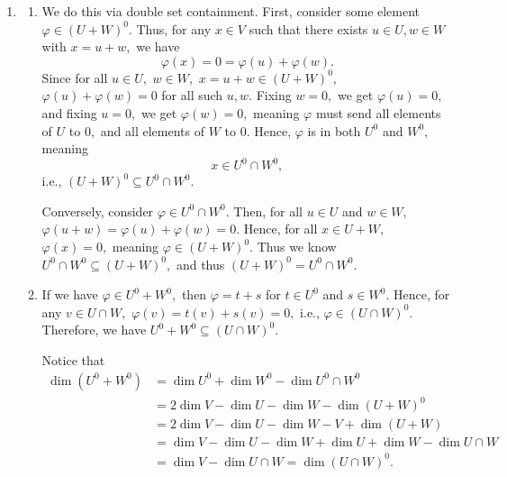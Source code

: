 \documentclass[12pt]{article}
\begin{document}
\begin{enumerate}
\begin{enumerate}
      \item Assume that $T: V \to W$ is surjective. Then, assume we
        have $\varphi, \psi \in W'$ such that $T(\varphi) = T(\psi),$
        or equivalently,
        $$
        \varphi \circ T = \psi \circ T.
        $$
        Hence, $$
        \varphi(T(v)) = \psi(T(v))
        $$
        for all $v \in V.$ Since $T$ is surjective, $\text{range}\, T
        = W,$ meaning for all $w \in W$ there is some $v_0$ such that
        $T(v_0) = w.$ Hence, for all $w,$ $\varphi(w) = \psi(w),$
        meaning $\varphi = \psi$ as required, since functionals are
        unique. Thus, $T'$ is injective, since $$T' \varphi = T '
        \psi \Rightarrow \varphi = \psi.$$
    \end{enumerate}

  \item
    \begin{enumerate}
      \item We do this via double set containment. First, consider
        some element $\varphi \in (U + W)^{0}.$ Thus, for any $x \in
        V$ such that there exists $u \in U, w \in W$ with $x = u +
        w,$ we have $$
        \varphi(x) = 0 = \varphi(u) + \varphi(w).
        $$
        Since for all $u \in U,$ $w \in W,$ $x = u + w \in (U +
        W)^{0},$ $\varphi(u) + \varphi(w) = 0$ for all such $u, w.$
        Fixing $w = 0,$ we get $\varphi(u) = 0,$ and fixing $u = 0,$
        we get $\varphi(w) = 0,$ meaning $\varphi$ must send all
        elements of $U$ to $0,$ and all elements of $W$ to $0.$
        Hence, $\varphi$ is in both $U^{0}$ and $W^{0},$ meaning
        $$
        x \in U^{0} \cap W^{0},
        $$
        i.e., $(U + W)^{0} \subseteq U^{0} \cap W^{0}.$

        Conversely, consider $\varphi \in U^{0} \cap W^{0}.$ Then,
        for all $u \in U$ and $w \in W,$ $\varphi(u + w) = \varphi(u)
        + \varphi(w) = 0.$ Hence, for all $x \in U + W, $ $\varphi
        (x) = 0,$ meaning $\varphi \in (U + W)^{0}.$ Thus we know
        $U^{0} \cap W^{0} \subseteq (U + W)^{0},$ and thus $(U +
        W)^{0} = U^{0} \cap W^{0}.$

      \item If we have $\varphi \in U^{0} +W^{0},$ then $\varphi = t
        + s$ for $t \in U^{0}$ and $s \in W^{0}.$ Hence, for any $v
        \in U \cap W,$ $\varphi(v) = t(v) + s(v) = 0,$ i.e., $\varphi
        \in (U \cap W)^{0}.$ Therefore, we have $U^{0} + W^{0}
        \subseteq (U \cap W)^{0}.$

        Notice that
        \begin{align*}
          \dim(U^{0} + W^{0}) &= \dim U^{0} + \dim W^{0} - \dim U^{0}
          \cap W^{0} \\
          &= 2\dim V - \dim U - \dim W-  \dim (U + W)^{0} \\
          &= 2 \dim V - \dim U - \dim W - V + \dim (U + W) \\
          &= \dim V - \dim U - \dim W + \dim U + \dim W - \dim U \cap W \\
          &= \dim V - \dim U \cap W = \dim (U \cap W)^{0}.
        \end{align*}


\end{enumerate}
\end{enumerate}
\end{document}
